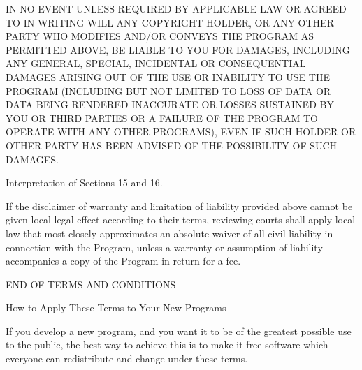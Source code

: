I\-N N\-O E\-V\-E\-N\-T U\-N\-L\-E\-S\-S R\-E\-Q\-U\-I\-R\-E\-D B\-Y A\-P\-P\-L\-I\-C\-A\-B\-L\-E L\-A\-W O\-R A\-G\-R\-E\-E\-D T\-O I\-N W\-R\-I\-T\-I\-N\-G W\-I\-L\-L A\-N\-Y C\-O\-P\-Y\-R\-I\-G\-H\-T H\-O\-L\-D\-E\-R, O\-R A\-N\-Y O\-T\-H\-E\-R P\-A\-R\-T\-Y W\-H\-O M\-O\-D\-I\-F\-I\-E\-S A\-N\-D/\-O\-R C\-O\-N\-V\-E\-Y\-S T\-H\-E P\-R\-O\-G\-R\-A\-M A\-S P\-E\-R\-M\-I\-T\-T\-E\-D A\-B\-O\-V\-E, B\-E L\-I\-A\-B\-L\-E T\-O Y\-O\-U F\-O\-R D\-A\-M\-A\-G\-E\-S, I\-N\-C\-L\-U\-D\-I\-N\-G A\-N\-Y G\-E\-N\-E\-R\-A\-L, S\-P\-E\-C\-I\-A\-L, I\-N\-C\-I\-D\-E\-N\-T\-A\-L O\-R C\-O\-N\-S\-E\-Q\-U\-E\-N\-T\-I\-A\-L D\-A\-M\-A\-G\-E\-S A\-R\-I\-S\-I\-N\-G O\-U\-T O\-F T\-H\-E U\-S\-E O\-R I\-N\-A\-B\-I\-L\-I\-T\-Y T\-O U\-S\-E T\-H\-E P\-R\-O\-G\-R\-A\-M (I\-N\-C\-L\-U\-D\-I\-N\-G B\-U\-T N\-O\-T L\-I\-M\-I\-T\-E\-D T\-O L\-O\-S\-S O\-F D\-A\-T\-A O\-R D\-A\-T\-A B\-E\-I\-N\-G R\-E\-N\-D\-E\-R\-E\-D I\-N\-A\-C\-C\-U\-R\-A\-T\-E O\-R L\-O\-S\-S\-E\-S S\-U\-S\-T\-A\-I\-N\-E\-D B\-Y Y\-O\-U O\-R T\-H\-I\-R\-D P\-A\-R\-T\-I\-E\-S O\-R A F\-A\-I\-L\-U\-R\-E O\-F T\-H\-E P\-R\-O\-G\-R\-A\-M T\-O O\-P\-E\-R\-A\-T\-E W\-I\-T\-H A\-N\-Y O\-T\-H\-E\-R P\-R\-O\-G\-R\-A\-M\-S), E\-V\-E\-N I\-F S\-U\-C\-H H\-O\-L\-D\-E\-R O\-R O\-T\-H\-E\-R P\-A\-R\-T\-Y H\-A\-S B\-E\-E\-N A\-D\-V\-I\-S\-E\-D O\-F T\-H\-E P\-O\-S\-S\-I\-B\-I\-L\-I\-T\-Y O\-F S\-U\-C\-H D\-A\-M\-A\-G\-E\-S.


\begin{DoxyEnumerate}
\item Interpretation of Sections 15 and 16.
\end{DoxyEnumerate}

If the disclaimer of warranty and limitation of liability provided above cannot be given local legal effect according to their terms, reviewing courts shall apply local law that most closely approximates an absolute waiver of all civil liability in connection with the Program, unless a warranty or assumption of liability accompanies a copy of the Program in return for a fee. \begin{DoxyVerb}                 END OF TERMS AND CONDITIONS

        How to Apply These Terms to Your New Programs
\end{DoxyVerb}


If you develop a new program, and you want it to be of the greatest possible use to the public, the best way to achieve this is to make it free software which everyone can redistribute and change under these terms.

